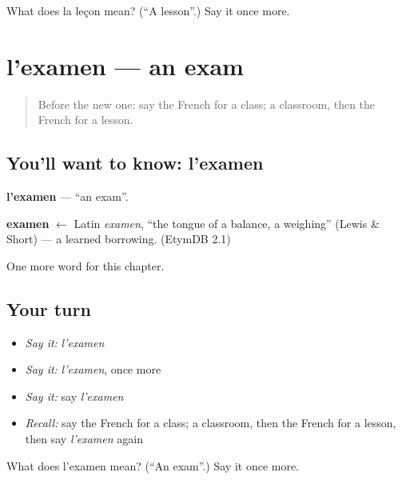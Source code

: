 \begin{tcolorbox}[breakable,colback=teal!4,colframe=teal!35!black,title={Before you move on}]
What does la leçon mean? (\textquotedblleft{}A lesson\textquotedblright{}.) Say it once more.
\end{tcolorbox}
\section[l'examen]{l'examen — an exam}

\label{lesson:FR-C126-examen}



\begin{quote}
Before the new one: say the French for a class; a classroom, then the French for a lesson.
\end{quote}

\subsection*{You'll want to know: l'examen}
\textbf{l'examen} — \textquotedblleft{}an exam\textquotedblright{}.

\begin{cousinweb}
\textbf{examen} $\leftarrow$ Latin \emph{examen}, \textquotedblleft{}the tongue of a balance, a weighing\textquotedblright{} (Lewis \& Short) — a learned borrowing. (EtymDB 2.1)
\end{cousinweb}

\begin{grammarlens}[title={What you've built}]
One more word for this chapter.
\end{grammarlens}

\subsection*{Your turn}
\begin{itemize}
\raggedright
  \item \emph{Say it:} \emph{l'examen}
  \item \emph{Say it:} \emph{l'examen}, once more
  \item \emph{Say it:} say \emph{l'examen}
  \item \emph{Recall:} say the French for a class; a classroom, then the French for a lesson, then say \emph{l'examen} again
\end{itemize}

\begin{tcolorbox}[breakable,colback=teal!4,colframe=teal!35!black,title={Before you move on}]
What does l'examen mean? (\textquotedblleft{}An exam\textquotedblright{}.) Say it once more.
\end{tcolorbox}
